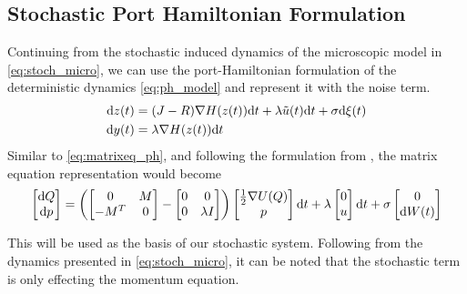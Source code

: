 \subsection{Stochastic Port Hamiltonian Formulation}
Continuing from the stochastic induced dynamics of the microscopic model in \autoref{eq:stoch_micro}, we can use the port-Hamiltonian formulation of the deterministic dynamics \autoref{eq:ph_model} and represent it with the noise term.
\begin{equation}
    \begin{aligned}
        \mathrm d z(t) &= (J-R)\nabla H(z(t))\mathrm d t + \lambda \tilde u(t)\mathrm d t + \sigma \mathrm d \xi(t)\\
        \mathrm d y(t) &= \lambda \nabla H(z(t))\mathrm d t
    \end{aligned}
    \label{eq:stoch_ph_model}
\end{equation}
Similar to \autoref{eq:matrixeq_ph}, and following the formulation from \cite{rudiger2024stability}, the matrix equation representation would become
\begin{gather}
    \begin{bmatrix}
        \mathrm d Q \\ \mathrm d p
    \end{bmatrix} =
    \left(
    \begin{bmatrix}
        0 & M \\ 
        -M^T & 0
    \end{bmatrix} -
    \begin{bmatrix}
        0 & 0 \\
        0 & \lambda I
    \end{bmatrix} \right)
    \begin{bmatrix}
        \frac{1}{2} \nabla U(Q) \\
        p 
    \end{bmatrix}\mathrm d t
    + \lambda 
    \begin{bmatrix}
        0 \\ u
    \end{bmatrix}\mathrm d t
    + \sigma
    \begin{bmatrix}
        0 \\ \mathrm d W(t)
    \end{bmatrix}
    \label{eq:matrix_stoc_eq_ph}
\end{gather}

This will be used as the basis of our stochastic system. Following from the dynamics presented in \autoref{eq:stoch_micro}, it can be noted that the stochastic term is only effecting the momentum equation.


